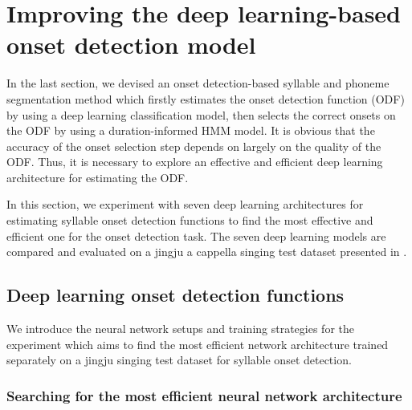 \section{Improving the deep learning-based onset detection model}

In the last section, we devised an onset detection-based syllable and phoneme segmentation method which firstly estimates the onset detection function (ODF) by using a deep learning classification model, then selects the correct onsets on the ODF by using a duration-informed HMM model. It is obvious that the accuracy of the onset selection step depends on largely on the quality of the ODF. Thus, it is necessary to explore an effective and efficient deep learning architecture for estimating the ODF.

In this section, we experiment with seven deep learning architectures for estimating syllable onset detection functions to find the most effective and efficient one for the onset detection task. The seven deep learning models are compared and evaluated on a jingju a cappella singing test dataset presented in .

\subsection{Deep learning onset detection functions}\label{sec:ch5:nn_onset_improving}

We introduce the neural network setups and training strategies for the experiment which aims to find the most efficient network architecture trained separately on a jingju singing test dataset for syllable onset detection.

\subsubsection{Searching for the most efficient neural network architecture}\label{sec:ch5:architectures_improving}

